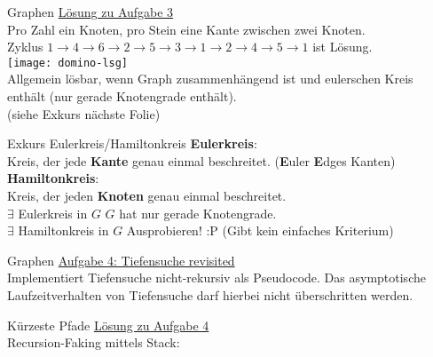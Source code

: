 \begin{frame}{Graphen}
	\underline{Lösung zu Aufgabe 3} \\
	Pro Zahl ein Knoten, pro Stein eine Kante zwischen zwei Knoten. \\
	Zyklus $1 \rightarrow 4 \rightarrow 6 \rightarrow 2 \rightarrow 5 \rightarrow 3 \rightarrow 1 \rightarrow 2 \rightarrow 4 \rightarrow 5 \rightarrow 1$ ist Lösung. \\
	\texttt{[image: domino-lsg]} \\
	\pause
	Allgemein lösbar, wenn Graph zusammenhängend ist und eulerschen Kreis enthält (\gdw nur gerade Knotengrade enthält). \\
	{\small (siehe Exkurs nächste Folie)}
\end{frame}

\begin{frame}{Exkurs Eulerkreis/Hamiltonkreis}
	\textbf{Eulerkreis}: \\
	Kreis, der jede \textbf{Kante} genau einmal beschreitet. {\small (\textbf{E}uler \impl \textbf{E}dges \impl Kanten)} \\
	\forcenewline
	\pause
	\textbf{Hamiltonkreis}: \\
	Kreis, der jeden \textbf{Knoten} genau einmal beschreitet. \\
	\forcenewline
	\pause
	$\exists$ Eulerkreis in $G$ \gdw $G$ hat nur gerade Knotengrade. \\
	$\exists$ Hamiltonkreis in $G$ \gdw Ausprobieren! :P (Gibt kein einfaches Kriterium)
\end{frame}


\begin{frame}{Graphen}
	\underline{Aufgabe 4: Tiefensuche revisited} \\
	Implementiert Tiefensuche nicht-rekursiv als Pseudocode. Das asymptotische Laufzeitverhalten von Tiefensuche darf hierbei nicht überschritten werden.
\end{frame}

\begin{frame}{Kürzeste Pfade}
	\underline{Lösung zu Aufgabe 4} \\
	Recursion-Faking mittels Stack: 
	\begin{algorithm}[H]
	\end{algorithm}
\end{frame}

